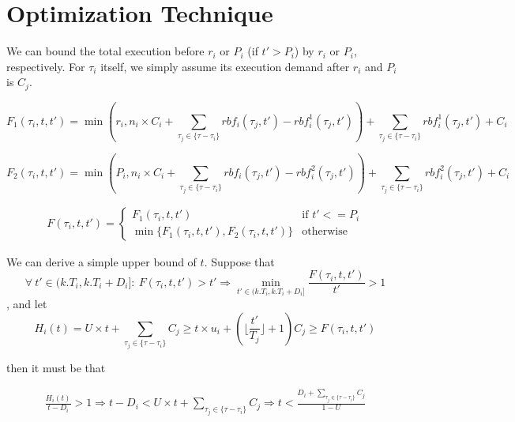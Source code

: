 \section{Optimization Technique}
We can bound the total execution before $r_i$ or $P_i$ (if $t'>P_i$) by $r_i$ or $P_i$, respectively. For $\tau_i$ itself, we simply assume its execution demand after $r_i$ and $P_i$ is $C_j$.

\begin{equation}
F_1(\tau_i,t,t')=\min\left(r_i,n_i\times C_i+\sum_{\tau_j\in\{\tau-\tau_i\}}rbf_i(\tau_j,t')-rbf_{i}^1(\tau_j,t')\right)+\sum_{\tau_j\in\{\tau-\tau_i\}}rbf_{i}^1(\tau_j,t')+C_i
\end{equation}


\begin{equation}
F_2(\tau_i,t,t')=\min\left(P_i,n_i\times C_i+\sum_{\tau_j\in\{\tau-\tau_i\}}rbf_i(\tau_j,t')-rbf_{i}^2(\tau_j,t')\right)+\sum_{\tau_j\in\{\tau-\tau_i\}}rbf_{i}^2(\tau_j,t')+C_i
\end{equation}

\begin{equation}
\begin{split}
F(\tau_i,t,t')=
\begin{cases}
F_1(\tau_i,t,t')&\mbox{if } t'<=P_i\\
\min\{F_1(\tau_i,t,t'),F_2(\tau_i,t,t')\}&\mbox{otherwise}
	\end{cases}	
\end{split}
\end{equation}




We can derive a simple upper bound of $t$. Suppose that
\[
\forall~t'\in(k.T_i,k.T_i+D_i]:~F(\tau_i,t,t')>t'\Rightarrow\min_{t'\in(k.T_i,k.T_i+D_i]}\frac{F(\tau_i,t,t')}{t'}>1
\]
, and let
\[
H_i(t)=  U\times t+\sum_{\tau_j\in\{\tau-\tau_i\}}C_j\geq t\times u_i+(\lfloor \frac{t'}{T_j} \rfloor+1)C_j\geq F(\tau_i,t,t')
\]

then it must be that

\begin{align*}
\frac{H_i(t)}{t-D_i}>1\Rightarrow t-D_i< U\times t+\sum_{\tau_j\in\{\tau-\tau_i\}}C_j\Rightarrow t<\frac{D_i+\sum_{\tau_j\in\{\tau-\tau_i\}}C_j}{1-U}
\end{align*}


